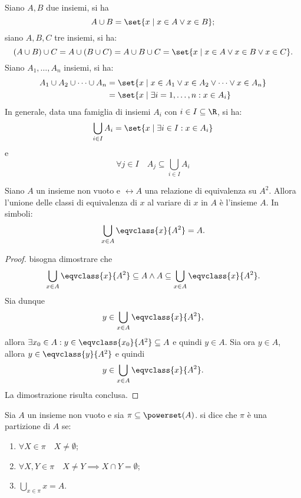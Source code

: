 \begin{remark}
    Siano \(A,B\) due insiemi, si ha
    \[
        A \cup B = \set{x \mid x \in A \lor x \in B};
    \]
    siano \(A,B,C\) tre insiemi, si ha:
    \[
        \left(A \cup B\right) \cup C = A \cup \left(B \cup C\right)
                                     = A \cup B \cup C
                                     = \set{x \mid x \in A \lor x \in B \lor x \in C}.
    \]
    Siano \(A_1, \dotsc, A_n\) insiemi, si ha:
    \begin{alignat*}{1}
        A_1 \cup A_2 \cup \cdots \cup A_n &= \set{x \mid x \in A_1 \lor x \in A_2 \lor \cdots \lor x \in A_n}\\
                                          &= \set{x \mid \exists i = 1, \dotsc, n : x \in A_i}
    \end{alignat*}
    In generale, data una famiglia di insiemi \(A_i\) con \(i \in I \subseteq \R\), si ha:
    \[
        \bigcup_{i \in I} A_i = \set{x \mid \exists i \in I : x \in A_i}
    \]
    e
    \[
        \forall j \in I \quad A_j \subseteq \bigcup_{i \in I} A_i
    \]
\end{remark}

\begin{proposition}%
    Siano \(A\) un insieme non vuoto e \(\rel{A}\) una relazione di equivalenza su \(A^2\). Allora l'unione delle classi di equivalenza di \(x\) al variare di \(x\) in \(A\) è l'insieme \(A\). In simboli:
    \[
        \bigcup_{x \in A} \eqvclass{x}{A^2} = A.
    \]
\end{proposition}

\begin{proof}
    bisogna dimostrare che
    \[
        \bigcup_{x \in A}\eqvclass{x}{A^2} \subseteq A
        \land
        A \subseteq \bigcup_{x \in A}\eqvclass{x}{A^2}.
    \]
    Sia dunque
    \[
        y \in \bigcup_{x \in A}\eqvclass{x}{A^2},
    \]
    allora \(\exists x_0 \in A : y \in \eqvclass{x_0}{A^2} \subseteq A\) e quindi \(y \in A\). Sia ora  \(y \in A\), allora \(y \in \eqvclass{y}{A^2}\) e quindi 
    \[
        y \in \bigcup_{x \in A}\eqvclass{x}{A^2}.
    \]
    La dimostrazione risulta conclusa.
\end{proof}


\begin{definition}[partizione]\label{def:partizione}
    Sia \(A\) un insieme non vuoto e sia \(\pi \subseteq \powerset(A)\). si dice che \(\pi\) è una partizione di \(A\) se:
    \begin{enumerate}
        \item \(\forall X \in \pi \quad X \neq \emptyset\);
        \item \(\forall X,Y \in \pi \quad X \neq Y \implies X \cap Y = \emptyset\);
        \item \(\bigcup_{x \in \pi} x = A\).
    \end{enumerate}
\end{definition}


